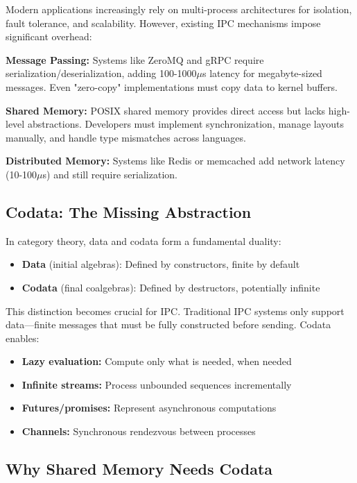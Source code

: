 \documentclass[letterpaper,twocolumn,10pt]{article}
\begin{document}
Modern applications increasingly rely on multi-process architectures for isolation, fault tolerance, and scalability. However, existing IPC mechanisms impose significant overhead:

\textbf{Message Passing:} Systems like ZeroMQ and gRPC require serialization/deserialization, adding 100-1000$\mu$s latency for megabyte-sized messages. Even "zero-copy" implementations must copy data to kernel buffers.

\textbf{Shared Memory:} POSIX shared memory provides direct access but lacks high-level abstractions. Developers must implement synchronization, manage layouts manually, and handle type mismatches across languages.

\textbf{Distributed Memory:} Systems like Redis or memcached add network latency (10-100$\mu$s) and still require serialization.

\subsection{Codata: The Missing Abstraction}

In category theory, data and codata form a fundamental duality:

\begin{itemize}
\item \textbf{Data} (initial algebras): Defined by constructors, finite by default
\item \textbf{Codata} (final coalgebras): Defined by destructors, potentially infinite
\end{itemize}

This distinction becomes crucial for IPC. Traditional IPC systems only support data---finite messages that must be fully constructed before sending. Codata enables:

\begin{itemize}
\item \textbf{Lazy evaluation:} Compute only what is needed, when needed
\item \textbf{Infinite streams:} Process unbounded sequences incrementally
\item \textbf{Futures/promises:} Represent asynchronous computations
\item \textbf{Channels:} Synchronous rendezvous between processes
\end{itemize}

\subsection{Why Shared Memory Needs Codata}
\end{document}
